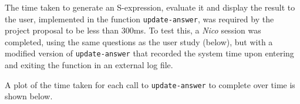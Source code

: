 \documentclass[12pt,twoside,notitlepage,xetex]{report}
\begin{document}
{The time taken to generate an S-expression, evaluate it and display the result to the user, implemented in the function \verb¬update-answer¬, was required by the project proposal to be less than 300ms.  To test this, a \emph{Nico} session was completed, using the same questions as the user study (below), but with a modified version of \verb¬update-answer¬ that recorded the system time upon entering and exiting the function in an external log file.

A plot of the time taken for each call to \verb¬update-answer¬ to complete over time is shown below.

\begin{center}
\begin{figure}[H]
\begin{center}
\\
\subfloat[]{
}
\end{center}
\end{figure}
\end{center}}
\end{document}
